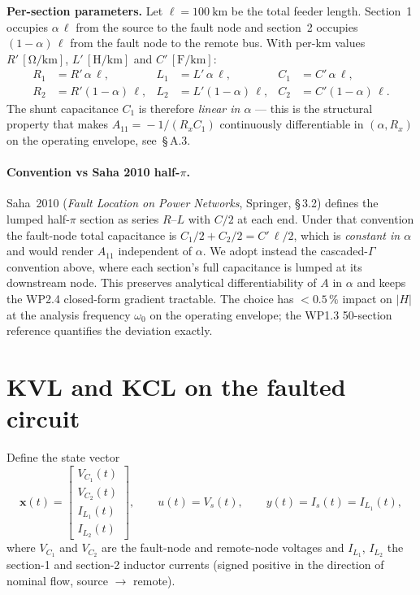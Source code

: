 \documentclass[11pt,a4paper]{article}
\begin{document}
\bigskip
\noindent\textbf{Per-section parameters.}  Let $\ell\!=\!\SI{100}{\km}$
be the total feeder length.  Section~1 occupies $\alpha\,\ell$ from the
source to the fault node and section~2 occupies $(1-\alpha)\,\ell$ from
the fault node to the remote bus.  With per-km values
$R'\,[\si{\ohm\per\km}]$, $L'\,[\si{\henry\per\km}]$ and
$C'\,[\si{\farad\per\km}]$:
\begin{align}
R_1 &= R'\,\alpha\,\ell,
& L_1 &= L'\,\alpha\,\ell,
& C_1 &= C'\,\alpha\,\ell,
\label{eq:perSecParams1}\\
R_2 &= R'(1-\alpha)\,\ell,
& L_2 &= L'(1-\alpha)\,\ell,
& C_2 &= C'(1-\alpha)\,\ell.
\label{eq:perSecParams2}
\end{align}
The shunt capacitance $C_1$ is therefore \emph{linear in $\alpha$} ---
this is the structural property that makes
$A_{11}\!=\!-1/(R_x C_1)$ continuously differentiable in
$(\alpha, R_x)$ on the operating envelope, see~\S\,A.3.

\paragraph{Convention vs Saha 2010 half-$\pi$.}
Saha~2010 (\textit{Fault Location on Power Networks}, Springer,
\S\,3.2) defines the lumped half-$\pi$ section as series $R$--$L$ with
$C/2$ at each end.  Under that convention the fault-node total
capacitance is $C_1/2 + C_2/2 = C'\,\ell/2$, which is
\emph{constant in $\alpha$} and would render $A_{11}$ independent of
$\alpha$.  We adopt instead the cascaded-$\Gamma$ convention above,
where each section's full capacitance is lumped at its downstream
node.  This preserves analytical differentiability of $A$ in $\alpha$
and keeps the WP2.4 closed-form gradient tractable.  The choice has
$<\!0.5\,\%$ impact on $|H|$ at the analysis frequency $\omega_0$ on
the operating envelope; the WP1.3 50-section reference quantifies the
deviation exactly.

\section{KVL and KCL on the faulted circuit}\label{sec:kvlkcl}

Define the state vector
\begin{equation}
  \mathbf{x}(t) = \begin{bmatrix}V_{C_1}(t)\\ V_{C_2}(t)\\
                                I_{L_1}(t)\\ I_{L_2}(t)\end{bmatrix},
  \qquad u(t) = V_s(t),\qquad y(t) = I_s(t) = I_{L_1}(t),
\end{equation}
where $V_{C_1}$ and $V_{C_2}$ are the fault-node and remote-node
voltages and $I_{L_1}$, $I_{L_2}$ the section-1 and section-2 inductor
currents (signed positive in the direction of nominal flow, source
$\to$ remote).
\end{document}
